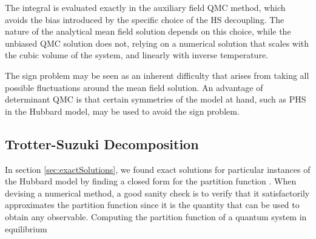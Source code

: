 The integral is evaluated exactly in the auxiliary field \acs{QMC} method, which avoids the bias introduced by the specific choice of the HS decoupling.
The nature of the analytical mean field solution depends on this choice, while the unbiased \acs{QMC} solution does not, relying on a numerical solution that scales with the cubic volume of the system, and linearly with inverse temperature.

The sign problem may be seen as an inherent difficulty that arises from taking all possible fluctuations around the mean field solution.
An advantage of determinant \acs{QMC} is that certain symmetries of the model at hand, such as \acs{PHS} in the Hubbard model, may be used to avoid the sign problem.

\subsection{Trotter-Suzuki Decomposition}
\label{subsec:trotter}

In section \ref{sec:exactSolutions}, we found exact solutions for particular instances of the Hubbard model by finding a closed form for the partition function \cite{hou_numerical_2009}. When devising a numerical method, a good sanity check is to verify that it satisfactorily approximates the partition function since it is the quantity that can be used to obtain  any observable.
Computing the partition function of a quantum system in equilibrium

